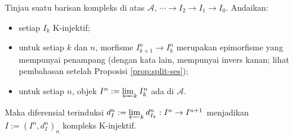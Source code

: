 \begin{lema}\label{prop:K-injective-projlimit-aux}
	Tinjau suatu barisan kompleks di atas $\mathcal{A}$,
	$\cdots\to I_2\to I_1\to I_0$. Andaikan:
	\begin{itemize}
		\item setiap $I_k$ K-injektif;
		\item untuk setiap $k$ dan $n$, morfisme
		$I_{k+1}^n\to I_k^n$ merupakan epimorfisme yang mempunyai
		penampang (dengan kata lain, mempunyai invers kanan; lihat pembahasan
		setelah Proposisi \ref{prop:split-ses});
		\item untuk setiap $n$, objek
		$I^n:=\varprojlim_k I_k^n$ ada di $\mathcal{A}$.
	\end{itemize}
	Maka diferensial terinduksi
	$d_I^n:=\varprojlim_k d_{I_k}^n:I^n\to I^{n+1}$ menjadikan
	$I:=(I^n,d_I^n)_n$ kompleks K-injektif.
\end{lema}

